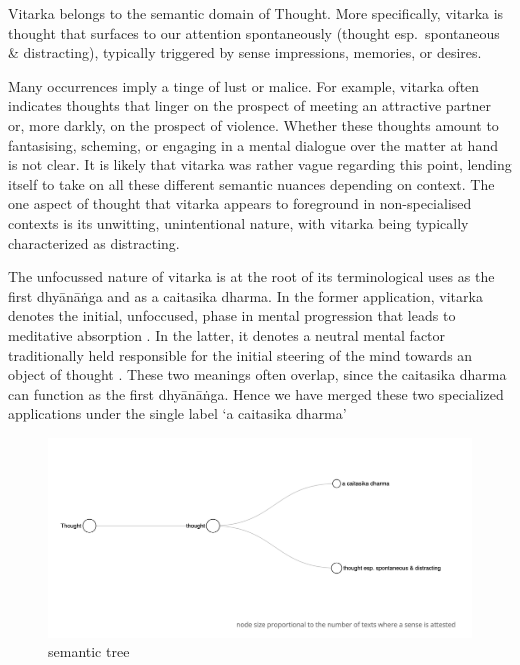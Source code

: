 \documentclass[
  letterpaper,
  DIV=11,
  numbers=noendperiod,
  oneside]{scrreprt}
\begin{document}
{}

Vitarka belongs to the semantic domain of Thought. More specifically,
vitarka is thought that surfaces to our attention spontaneously (thought
esp.~spontaneous \& distracting), typically triggered by sense
impressions, memories, or desires.

Many occurrences imply a tinge of lust or malice. For example, vitarka
often indicates thoughts that linger on the prospect of meeting an
attractive partner or, more darkly, on the prospect of violence. Whether
these thoughts amount to fantasising, scheming, or engaging in a mental
dialogue over the matter at hand is not clear. It is likely that vitarka
was rather vague regarding this point, lending itself to take on all
these different semantic nuances depending on context. The one aspect of
thought that vitarka appears to foreground in non-specialised contexts
is its unwitting, unintentional nature, with vitarka being typically
characterized as distracting.

The unfocussed nature of vitarka is at the root of its terminological
uses as the first dhyānāṅga and as a caitasika dharma. In the former
application, vitarka denotes the initial, unfoccused, phase in mental
progression that leads to meditative absorption . In the latter, it
denotes a neutral mental factor traditionally held responsible for the
initial steering of the mind towards an object of thought . These two
meanings often overlap, since the caitasika dharma can function as the
first dhyānāṅga. Hence we have merged these two specialized applications
under the single label `a caitasika dharma'

\begin{figure}

{\centering \includegraphics{./www/semanticTree_vitarka.png}

}

\caption{\label{fig-semantictree}semantic tree}

\end{figure}
\end{document}
